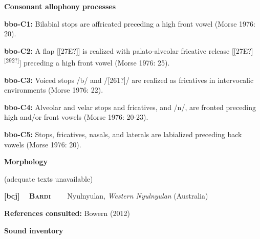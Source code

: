 \begin{styleBody}
\textbf{Consonant allophony processes}
\end{styleBody}

\begin{styleBody}
\textbf{bbo-C1: }Bilabial stops are affricated preceding a high front vowel (Morse 1976: 20).
\end{styleBody}

\begin{styleBody}
\textbf{bbo-C2: }A flap [[27E?]] is realized with palato-alveolar fricative release [[27E?]\textsuperscript{[292?]}] preceding a high front vowel (Morse 1976: 25).
\end{styleBody}

\begin{styleBody}
\textbf{bbo-C3: }Voiced stops /b/ and /[261?]/ are realized as fricatives in intervocalic environments (Morse 1976: 22).
\end{styleBody}

\begin{styleBody}
\textbf{bbo-C4: }Alveolar and velar stops and fricatives, and /n/, are fronted preceding high and/or front vowels (Morse 1976: 20-23).
\end{styleBody}

\begin{styleBody}
\textbf{bbo-C5: }Stops, fricatives, nasals, and laterals are labialized preceding back vowels (Morse 1976: 20).
\end{styleBody}

\begin{styleBody}
\textbf{Morphology}
\end{styleBody}

\begin{styleBody}
(adequate texts unavailable)
\end{styleBody}

\clearpage\begin{styleBody}
\textbf{[bcj] }\ \ \textbf{\textsc{Bardi\ \ }}\textbf{\ \ }Nyulnyulan, \textit{Western Nyulnyulan} (Australia)
\end{styleBody}

\begin{styleBody}
\textbf{References consulted: }Bowern (2012)
\end{styleBody}

\begin{styleBody}
\textbf{Sound inventory}
\end{styleBody}

